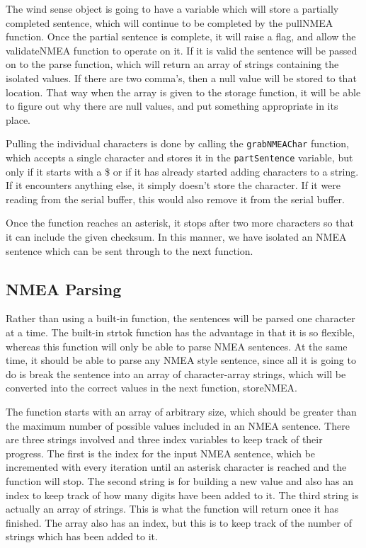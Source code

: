 \documentclass[letterpaper]{article}
\begin{document}
The wind sense object is going to have a variable which will store a partially completed sentence, which will continue to be completed by the pullNMEA function. Once the partial sentence is complete, it will raise a flag, and allow the validateNMEA function to operate on it. If it is valid the sentence will be passed on to the parse function, which will return an array of strings containing the isolated values. If there are two comma's, then a null value will be stored to that location. That way when the array is given to the storage function, it will be able to figure out why there are null values, and put something appropriate in its place. 

Pulling the individual characters is done by calling the \verb:grabNMEAChar: function, which accepts a single character and stores it in the \verb:partSentence: variable, but only if it starts with a \$ or if it has already started adding characters to a string. If it encounters anything else, it simply doesn't store the character. If it were reading from the serial buffer, this would also remove it from the serial buffer. 

Once the function reaches an asterisk, it stops after two more characters so that it can include the given checksum. In this manner, we have isolated an NMEA sentence which can be sent through to the next function. 

\subsection{NMEA Parsing} %
\label{sub:NMEA Parsing}

Rather than using a built-in function, the sentences will be parsed one character at a time. The built-in strtok function has the advantage in that it is so flexible, whereas this function will only be able to parse NMEA sentences. At the same time, it should be able to parse any NMEA style sentence, since all it is going to do is break the sentence into an array of character-array strings, which will be converted into the correct values in the next function, storeNMEA.

The function starts with an array of arbitrary size, which should be greater than the maximum number of possible values included in an NMEA sentence. There are three strings involved and three index variables to keep track of their progress. The first is the index for the input NMEA sentence, which be incremented with every iteration until an asterisk character is reached and the function will stop. The second string is for building a new value and also has an index to keep track of how many digits have been added to it. The third string is actually an array of strings. This is what the function will return once it has finished. The array also has an index, but this is to keep track of the number of strings which has been added to it.
\end{document}
